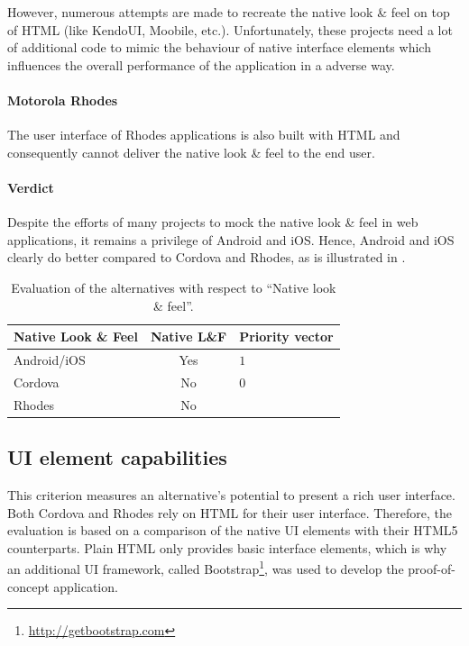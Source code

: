 However, numerous attempts are made to recreate the native look \& feel on top of HTML (like KendoUI, Moobile, etc.). Unfortunately, these projects need a lot of additional code to mimic the behaviour of native interface elements which influences the overall performance of the application in a adverse way.

\paragraph{Motorola Rhodes} The user interface of Rhodes applications is also built with HTML and consequently cannot deliver the native look \& feel to the end user.

\paragraph{Verdict} Despite the efforts of many projects to mock the native look \& feel in web applications, it remains a privilege of Android and iOS. Hence, Android and iOS clearly do better compared to Cordova and Rhodes, as is illustrated in .

\begin{table}[h!]
    \begin{center}
        \begin{tabular}{lcl}
            \hline
            \textbf{Native Look \& Feel} & Native L\&F & Priority vector \\
            \hline
            Android/iOS          & Yes      & $1$  \\
            Cordova              & No       & $0$  \\
            Rhodes               & No       & $$   \\
            \hline
        \end{tabular}
        \caption{Evaluation of the alternatives with respect to ``Native look \& feel''.}
        \label{tab:nlf}
    \end{center}
\end{table}

\subsection{UI element capabilities}

This criterion measures an alternative's potential to present a rich user interface. Both Cordova and Rhodes rely on HTML for their user interface. Therefore, the evaluation is based on a comparison of the native UI elements with their HTML5 counterparts. Plain HTML only provides basic interface elements, which is why an additional UI framework, called Bootstrap\footnote{\url{http://getbootstrap.com}}, was used to develop the proof-of-concept application. 

